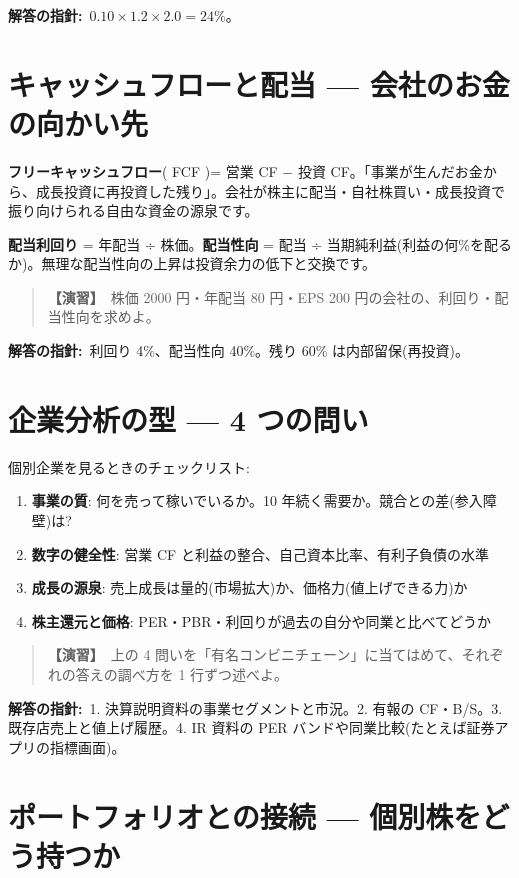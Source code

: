 \documentclass{article}
\begin{document}
\textbf{解答の指針:}\ \(0.10 \times 1.2 \times 2.0 = 24\%\)。

\section{キャッシュフローと配当 — 会社のお金の向かい先}

\textbf{フリーキャッシュフロー}( FCF )= 営業 CF − 投資 CF。「事業が生んだお金から、成長投資に再投資した残り」。会社が株主に配当・自社株買い・成長投資で振り向けられる自由な資金の源泉です。

\textbf{配当利回り} = 年配当 ÷ 株価。\textbf{配当性向} = 配当 ÷ 当期純利益(利益の何\%を配るか)。無理な配当性向の上昇は投資余力の低下と交換です。

\begin{quote}
\textbf{【演習】}\ 株価 2000 円・年配当 80 円・EPS 200 円の会社の、利回り・配当性向を求めよ。
\end{quote}

\textbf{解答の指針:}\ 利回り 4\%、配当性向 40\%。残り 60\% は内部留保(再投資)。

\section{企業分析の型 — 4 つの問い}

個別企業を見るときのチェックリスト:

\begin{enumerate}
\item \textbf{事業の質}: 何を売って稼いでいるか。10 年続く需要か。競合との差(参入障壁)は?
\item \textbf{数字の健全性}: 営業 CF と利益の整合、自己資本比率、有利子負債の水準
\item \textbf{成長の源泉}: 売上成長は量的(市場拡大)か、価格力(値上げできる力)か
\item \textbf{株主還元と価格}: PER・PBR・利回りが過去の自分や同業と比べてどうか
\end{enumerate}

\begin{quote}
\textbf{【演習】}\ 上の 4 問いを「有名コンビニチェーン」に当てはめて、それぞれの答えの調べ方を 1 行ずつ述べよ。
\end{quote}

\textbf{解答の指針:}\ 1. 決算説明資料の事業セグメントと市況。2. 有報の CF・B/S。3. 既存店売上と値上げ履歴。4. IR 資料の PER バンドや同業比較(たとえば証券アプリの指標画面)。

\section{ポートフォリオとの接続 — 個別株をどう持つか}
\end{document}
